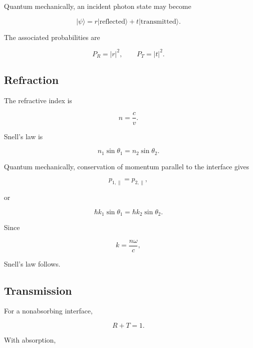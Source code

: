 \documentclass[12pt]{article}
\begin{document}
Quantum mechanically, an incident photon state may become

\begin{equation}
|\psi\rangle
=
r|\text{reflected}\rangle
+
t|\text{transmitted}\rangle.
\end{equation}

The associated probabilities are

\begin{equation}
P_R=|r|^2,
\qquad
P_T=|t|^2.
\end{equation}

\subsection{Refraction}

The refractive index is

\begin{equation}
n=\frac{c}{v}.
\end{equation}

Snell's law is

\begin{equation}
\boxed{n_1\sin\theta_1=n_2\sin\theta_2}.
\end{equation}

Quantum mechanically, conservation of momentum parallel to the interface gives

\begin{equation}
p_{1,\parallel}=p_{2,\parallel},
\end{equation}

or

\begin{equation}
\hbar k_1\sin\theta_1
=
\hbar k_2\sin\theta_2.
\end{equation}

Since

\begin{equation}
k=\frac{n\omega}{c},
\end{equation}

Snell's law follows.

\subsection{Transmission}

For a nonabsorbing interface,

\begin{equation}
R+T=1.
\end{equation}

With absorption,
\end{document}
